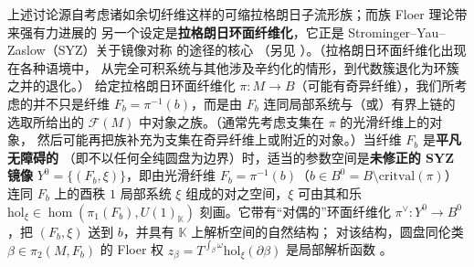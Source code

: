 \documentclass[UTF8,a4paper,11pt,fontset=windows]{ctexart}
\theoremstyle{cnthm}
\numberwithin{equation}{section}
\newcommand{\C}{\mathbb{C}}
\newcommand{\R}{\mathbb{R}}
\newcommand{\KK}{\mathbb{K}}          %
\newcommand{\FF}{\mathcal{F}}         %
\begin{document}

上述讨论源自考虑诸如余切纤维这样的可缩拉格朗日子流形族；而族 Floer 理论带来强有力进展的
另一个设定是\textbf{拉格朗日环面纤维化}，它正是 Strominger--Yau--Zaslow（SYZ）关于镜像对称
的途径的核心 \cite{r97}（另见 \cite{r19}）。（拉格朗日环面纤维化出现在各种语境中，
从完全可积系统与其他涉及辛约化的情形，到代数簇退化为环簇之并的退化。）
给定拉格朗日环面纤维化 $\pi:M\to B$（可能有奇异纤维），我们所考虑的并不只是纤维
$F_b=\pi^{-1}(b)$，而是由 $F_b$ 连同局部系统与（或）有界上链的选取所给出的
$\FF(M)$ 中对象之族。（通常先考虑支集在 $\pi$ 的光滑纤维上的对象，
然后可能再把族补充为支集在奇异纤维上或附近的对象。）当纤维 $F_b$ 是\textbf{平凡无障碍的}
（即不以任何全纯圆盘为边界）时，适当的参数空间是\textbf{未修正的 SYZ 镜像}
$Y^{0}=\{(F_b,\xi)\}$，即由光滑纤维 $F_b=\pi^{-1}(b)$（$b\in B^{0}=B\setminus\mathrm{critval}(\pi)$）
连同 $F_b$ 上的酉秩 $1$ 局部系统 $\xi$ 组成的对之空间，$\xi$ 可由其和乐
$\mathrm{hol}_{\xi}\in\hom(\pi_1(F_b),U(1)_\KK)$ 刻画。它带有“对偶的”环面纤维化
$\pi^{\vee}:Y^{0}\to B^{0}$，把 $(F_b,\xi)$ 送到 $b$，并具有 $\KK$ 上解析空间的自然结构；
对该结构，圆盘同伦类 $\beta\in\pi_2(M,F_b)$ 的 Floer 权
$z_{\beta}=T^{\int_{\beta}\omega}\mathrm{hol}_{\xi}(\partial\beta)$ 是局部解析函数
\cite{r19,r4,r41}。

\end{document}
